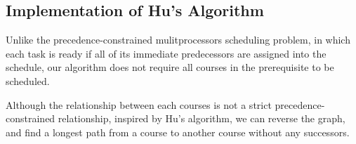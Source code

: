 \documentclass[letterpaper,12pt]{article}
\theoremstyle{definition}
\begin{document}



\subsection{Implementation of Hu's Algorithm}\label{HuAlgorithm}

Unlike the precedence-constrained mulitprocessors scheduling problem, in which each task is ready if all of its immediate predecessors are assigned into the schedule, our algorithm does not require all courses in the prerequisite to be scheduled. 

Although the relationship between each courses is not a strict precedence-constrained relationship, inspired by Hu's algorithm, we can reverse the graph, and find a longest path from a course to another course without any successors. 
\end{document}
